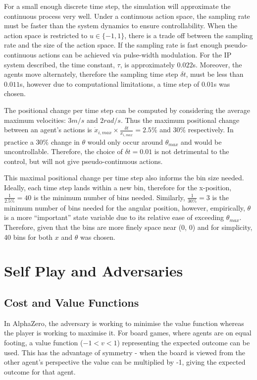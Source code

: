 \documentclass[../main.tex]{subfiles}
\begin{document}
For a small enough discrete time step, the simulation will approximate the continuous process very well. Under a continuous action space, the sampling rate must be faster than the system dynamics to ensure controllability. When the action space is restricted to $u \in \{-1, 1\}$, there is a trade off between the sampling rate and the size of the action space. If the sampling rate is fast enough pseudo-continuous actions can be achieved via pulse-width modulation. For the IP system described, the time constant, $\tau$, is approximately $0.022$s. Moreover, the agents move alternately, therefore the sampling time step $ \delta t$, must be  less than  $0.011$s, however due to computational limitations, a time step of $0.01$s was chosen.

The positional change per time step can be computed by considering the average maximum velocities: $3m/s$ and $2rad/s$. Thus the maximum positional change between an agent's actions is $\dot{x}_{i, max} \times \frac{\delta t}{x_{i, max}} = 2.5\%$ and $30\%$ respectively. In practice a $30\%$ change in $\theta$ would only occur around $\theta_{max}$ and would be uncontrollable. Therefore, the choice of $\delta t = 0.01$ is not detrimental to the control, but will not give pseudo-continuous actions.

This maximal positional change per time step also informs the bin size needed. Ideally, each time step lands within a new bin, therefore for the x-position, $\frac{1}{2.5\%} = 40$ is the minimum number of bins needed. Similarly, $\frac{1}{30\%} = 3$ is the minimum number of bins needed for the angular position, however, empirically, $\theta$ is a more ``important'' state variable due to its relative ease of exceeding $\theta_{max}$. Therefore, given that the bins are more finely space near (0, 0) and for simplicity, 40 bins for both $x$ and $\theta$ was chosen.

\section{Self Play and Adversaries}

\subsection{Cost and Value Functions}

In AlphaZero, the adversary is working to minimise the value function whereas the player is working to maximise it. For board games, where agents are on equal footing, a value function ($-1 < v < 1$) representing the expected outcome can be used. This has the advantage of symmetry - when the board is viewed from the other agent's perspective the value can be multiplied by -1, giving the expected outcome for that agent.
\end{document}
